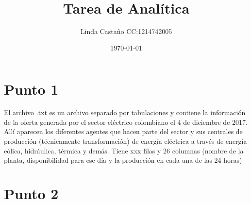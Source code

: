 \documentclass[spanish,a4paper]{article}
\title{Tarea de Analítica}
\author{Linda Castaño \quad CC:1214742005\\ }
\date{\today}
\begin{document}
\maketitle

\section{Punto 1}
El archivo .txt es un archivo separado por tabulaciones y contiene la información de la oferta generada por el sector eléctrico colombiano el 4 de diciembre de 2017. Allí aparecen los diferentes agentes que hacen parte del sector y sus centrales de producción (técnicamente transformación) de energía eléctrica a través de energía eólica, hidráulica, térmica y demás. Tiene xxx filas y 26 columnas (nombre de la planta, disponibilidad para ese día y la producción en cada una de las 24 horas)



\section{Punto 2}
\end{document}
